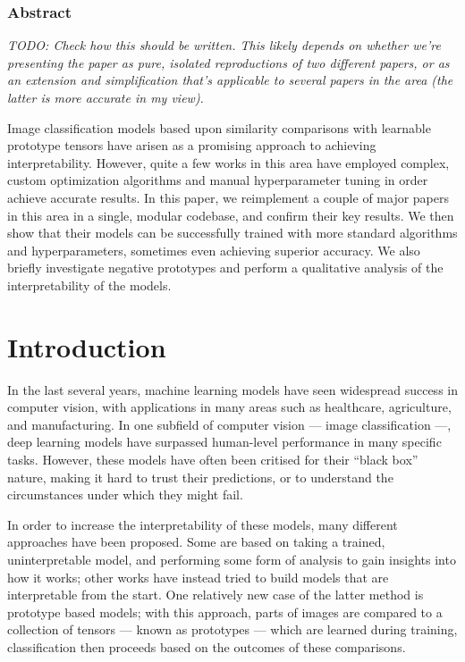 \documentclass{rescience}
\begin{document}
\hypersetup{linkcolor=black,urlcolor=darkgray}
\renewcommand\emph[1]{{\bfseries #1}}



\subsubsection{Abstract}
\textit{TODO: Check how this should be written. This likely depends on whether we're presenting the paper as pure, isolated reproductions of two different papers, or as an extension and simplification that's applicable to several papers in the area (the latter is more accurate in my view).}

Image classification models based upon similarity comparisons with learnable prototype tensors have arisen as a promising approach to achieving interpretability. However, quite a few works in this area have employed complex, custom optimization algorithms and manual hyperparameter tuning in order achieve accurate results. In this paper, we reimplement a couple of major papers in this area in a single, modular codebase, and confirm their key results. We then show that their models can be successfully trained with more standard algorithms and hyperparameters, sometimes even achieving superior accuracy. We also briefly investigate negative prototypes and perform a qualitative analysis of the interpretability of the models.


\section{Introduction}
In the last several years, machine learning models have seen widespread success in computer vision, with applications in many areas such as healthcare, agriculture, and manufacturing. In one subfield of computer vision --- image classification ---, deep learning models have surpassed human-level performance in  many specific tasks. However, these models have often been critised for their ``black box'' nature, making it hard to trust their predictions, or to understand the circumstances under which they might fail.

In order to increase the interpretability of these models, many different approaches have been proposed. Some are based on taking a trained, uninterpretable model, and performing some form of analysis to gain insights into how it works; other works have instead tried to build models that are interpretable from the start. One relatively new case of the latter method is prototype based models; with this approach, parts of images are compared to a collection of tensors --- known as prototypes --- which are learned during training, classification then proceeds based on the outcomes of these comparisons.
\end{document}

